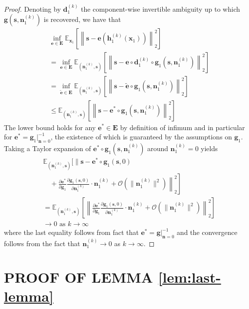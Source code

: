 \documentclass[letterpaper]{article}
\theoremstyle{definition}
\begin{document}
\begin{proof}
Denoting by $\bm{d}^{(k)}_1$ the component-wise invertible ambiguity up to which $\bm{g}(\bm{s}, \bm{n}_1^{(k)})$ is recovered, we have that
\begin{align}
     &\inf_{\bm{e}\in \bm{E}} \mathbb{E}_{\bm{x}_1} \left[ \left \|\bm{s} - \bm{e}(\bm{h}_1^{(k)}(\bm{x}_1)) \right \|_2^2 \right]\\
    &=\inf_{\bm{e}\in \bm{E}} \mathbb{E}_{(\bm{n}_1^{(k)}, \bm{s})} \left[ \left \|\bm{s} - \bm{e} \circ \bm{d}^{(k)}_1 \circ \bm{g}_1(\bm{s}, \bm{n}_1^{(k)}) \right \|_2^2 \right]\\
    &=\inf_{\tilde{\bm{e}}\in \bm{E}} \mathbb{E}_{(\bm{n}_1^{(k)}, \bm{s})} \left[ \left \|\bm{s} - \tilde{\bm{e}} \circ  \bm{g}_1(\bm{s}, \bm{n}_1^{(k)}) \right \|_2^2 \right]  \\
    &\leq\mathbb{E}_{(\bm{n}_1^{(k)}, \bm{s})} \left[ \left \|\bm{s} - \bm{e^*} \circ  \bm{g}_1(\bm{s}, \bm{n}_1^{(k)}) \right \|_2^2 \right]\label{eq:low_bounded}
\end{align}
The lower bound holds for any $\bm{e^*}\in\bm{E}$ by definition of infimum and in particular for $\bm{e^*} = \bm{g}_1 |^{-1}_{\bm{n}=0}$, the existence of which is guaranteed by the assumptions on $\bm{g}_1$.
Taking a Taylor expansion of $\bm{e^*} \circ  \bm{g}_1(\bm{s}, \bm{n}_1^{(k)})$ around $\bm{n}_1^{(k)}=0$ yields
\begin{align*}
     &\mathbb{E}_{(\bm{n}_1^{(k)}, \bm{s})} \Bigg[  \Bigg\|\bm{s} - \bm{e^*} \circ \bm{g}_1 (\bm{s}, 0) \\
     &\quad+ \left.\left.\frac{\partial \bm{e^*}}{\partial \bm{g}_1} \frac{\partial \bm{g}_1 (\bm{s}, 0)}{\partial \bm{n}_1^{(k)}} \cdot \bm{n}_1^{(k)} + \mathcal{O}(\|\bm{n}_1^{(k)}\|^2) \right \|_2^2 \right]\\
     &=\mathbb{E}_{(\bm{n}_1^{(k)}, \bm{s})} \left[ \left \|\frac{\partial \bm{e^*}}{\partial \bm{g}_1} \frac{\partial \bm{g}_1 (\bm{s}, 0)}{\partial \bm{n}_1^{(k)}} \cdot \bm{n}_1^{(k)} + \mathcal{O}(\|\bm{n}_1^{(k)}\|^2) \right \|_2^2 \right]\\
     &\longrightarrow 0 \text{ as $k \longrightarrow \infty$}
\end{align*}
where the last equality follows from fact that $\bm{e^*} = \bm{g} |^{-1}_{\bm{n}=0}$ and the convergence follows from the fact that $\bm{n}_1^{(k)} \longrightarrow 0$ as $k \to \infty$.
\end{proof}



\section{PROOF OF LEMMA \ref{lem:last-lemma}}
\label{appendix:last-lemma}
\end{document}
